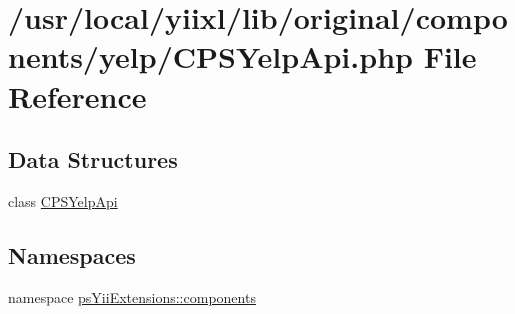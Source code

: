 \hypertarget{CPSYelpApi_8php}{
\section{/usr/local/yiixl/lib/original/components/yelp/CPSYelpApi.php File Reference}
\label{CPSYelpApi_8php}
}
\subsection*{Data Structures}
\begin{DoxyCompactItemize}
\item 
class \hyperlink{classCPSYelpApi}{CPSYelpApi}
\end{DoxyCompactItemize}
\subsection*{Namespaces}
\begin{DoxyCompactItemize}
\item 
namespace \hyperlink{namespacepsYiiExtensions_1_1components}{psYiiExtensions::components}
\end{DoxyCompactItemize}
